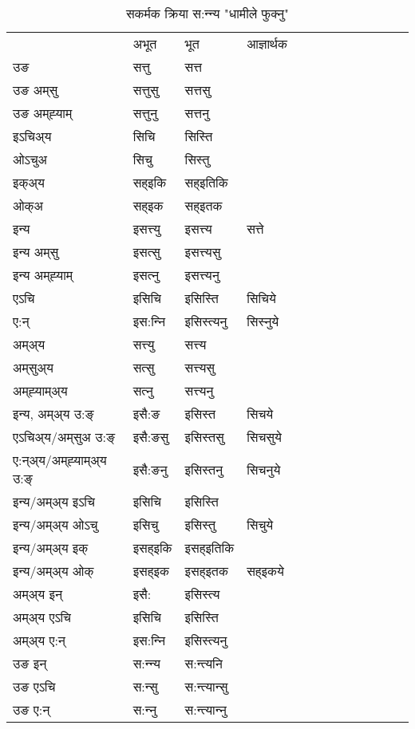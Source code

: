\begin{table}[H]
\centering
\caption{\label{itt.vt} सकर्मक क्रिया  स:न्‍न्य  "धामीले फुक्नु"  }
\begin{tabular}{l|l|l|l|l|l|l|l|l|l|l|l|l}  \toprule
&अभूत & भूत & आज्ञार्थक \\ 
उङ &सत्तु &सत्त \\ 
उङ अम्‌सु&सत्तुसु &सत्तसु \\ 
उङ अम्‌ह्‍याम्&सत्तुनु &सत्तनु \\ 
इऽचिअ्य &सिचि &सिस्ति   \\ 
ओऽचुअ        &सिचु &सिस्तु   \\ 
इक्अ्य&सह्इकि &सह्इतिकि   \\ 
ओक्अ &सह्इक &सह्इतक   \\ 
इन्य & इसत्त्यु  & इसत्त्य &सत्ते  \\ 
इन्य अम्‌सु& इसत्सु  & इसत्त्यसु   \\ 
इन्य अम्‌ह्‍याम्& इसत्‍नु  & इसत्त्यनु   \\ 
एऽचि & इसिचि & इसिस्ति &सिचिये    \\ 
ए:न् & इस:न्‍नि  & इसिस्त्यनु &सिस्‍नुये  \\ 
अम्अ्य & सत्त्यु  & सत्त्य  \\ 
अम्‌सुअ्य & सत्सु & सत्त्यसु  \\ 
अम्‌ह्‍याम्अ्य & सत्‍नु  & सत्त्यनु \\ 
\midrule
इन्य, अम्अ्य उ:ङ्‌ &इसै:ङ &इसिस्त &सिचये \\ 
एऽचिअ्य/अम्‌सुअ उ:ङ्‌ &इसै:ङसु &इसिस्तसु &सिचसुये \\ 
ए:न्अ्य/अम्‌ह्‍याम्अ्य उ:ङ्‌ &इसै:ङनु &इसिस्तनु &सिचनुये \\ 
इन्य/अम्अ्य इऽचि &इसिचि &इसिस्ति    \\ 
इन्य/अम्अ्य ओऽचु &इसिचु &इसिस्तु  &सिचुये  \\ 
इन्य/अम्अ्य इक् &इसह्इकि &इसह्इतिकि   \\ 
इन्य/अम्अ्य ओक् &इसह्इक &इसह्इतक  &सह्इकये  \\ 
अम्अ्य इन् & इसै: & इसिस्त्य   \\ 
अम्अ्य एऽचि & इसिचि & इसिस्ति    \\ 
अम्अ्य ए:न् & इस:न्‍नि  & इसिस्त्यनु  \\ 
\midrule
उङ इन् & स:न्‍न्य  & स:न्त्यनि  \\ 
उङ एऽचि & स:न्सु  & स:न्त्यान्सु   \\ 
उङ ए:न्& स:न्‍नु  & स:न्त्यान्‍नु   \\ 
\bottomrule
\end{tabular}
\end{table}


